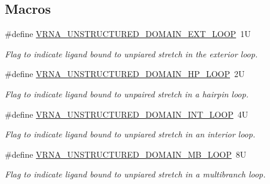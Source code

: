 \subsection*{Macros}
\begin{DoxyCompactItemize}
\item 
\mbox{\label{group__domains__up_gaac911374e86236a51bfd42e1f098eaba}} 
\#define \hyperlink{group__domains__up_gaac911374e86236a51bfd42e1f098eaba}{V\+R\+N\+A\+\_\+\+U\+N\+S\+T\+R\+U\+C\+T\+U\+R\+E\+D\+\_\+\+D\+O\+M\+A\+I\+N\+\_\+\+E\+X\+T\+\_\+\+L\+O\+OP}~1U
\begin{DoxyCompactList}\small\item\em Flag to indicate ligand bound to unpiared stretch in the exterior loop. \end{DoxyCompactList}\item 
\mbox{\label{group__domains__up_ga23b610ea9564346c45cc1e2bbb62adf7}} 
\#define \hyperlink{group__domains__up_ga23b610ea9564346c45cc1e2bbb62adf7}{V\+R\+N\+A\+\_\+\+U\+N\+S\+T\+R\+U\+C\+T\+U\+R\+E\+D\+\_\+\+D\+O\+M\+A\+I\+N\+\_\+\+H\+P\+\_\+\+L\+O\+OP}~2U
\begin{DoxyCompactList}\small\item\em Flag to indicate ligand bound to unpaired stretch in a hairpin loop. \end{DoxyCompactList}\item 
\mbox{\label{group__domains__up_gac4a0feccd9654c149203200248c2716b}} 
\#define \hyperlink{group__domains__up_gac4a0feccd9654c149203200248c2716b}{V\+R\+N\+A\+\_\+\+U\+N\+S\+T\+R\+U\+C\+T\+U\+R\+E\+D\+\_\+\+D\+O\+M\+A\+I\+N\+\_\+\+I\+N\+T\+\_\+\+L\+O\+OP}~4U
\begin{DoxyCompactList}\small\item\em Flag to indicate ligand bound to unpiared stretch in an interior loop. \end{DoxyCompactList}\item 
\mbox{\label{group__domains__up_ga67b80796655e5227a4ed662bfbe398b0}} 
\#define \hyperlink{group__domains__up_ga67b80796655e5227a4ed662bfbe398b0}{V\+R\+N\+A\+\_\+\+U\+N\+S\+T\+R\+U\+C\+T\+U\+R\+E\+D\+\_\+\+D\+O\+M\+A\+I\+N\+\_\+\+M\+B\+\_\+\+L\+O\+OP}~8U
\begin{DoxyCompactList}\small\item\em Flag to indicate ligand bound to unpiared stretch in a multibranch loop. \end{DoxyCompactList}\item 

\end{DoxyCompactItemize}
